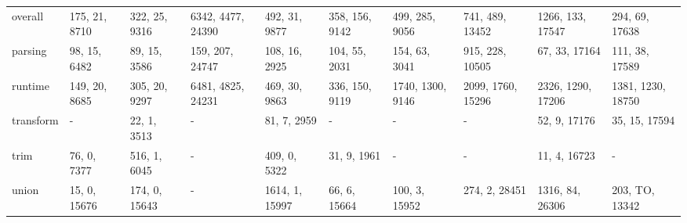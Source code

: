 \begin{tabular}{llllllllll}
 overall             & 175, 21, 8710  & 322, 25, 9316 & 6342, 4477, 24390 & 492, 31, 9877  & 358, 156, 9142 & 499, 285, 9056   & 741, 489, 13452   & 1266, 133, 17547  & 294, 69, 17638    \\
 parsing             & 98, 15, 6482   & 89, 15, 3586  & 159, 207, 24747   & 108, 16, 2925  & 104, 55, 2031  & 154, 63, 3041    & 915, 228, 10505   & 67, 33, 17164     & 111, 38, 17589    \\
 runtime             & 149, 20, 8685  & 305, 20, 9297 & 6481, 4825, 24231 & 469, 30, 9863  & 336, 150, 9119 & 1740, 1300, 9146 & 2099, 1760, 15296 & 2326, 1290, 17206 & 1381, 1230, 18750 \\
 transform           & -              & 22, 1, 3513   & -                 & 81, 7, 2959    & -              & -                & -                 & 52, 9, 17176      & 35, 15, 17594     \\
 trim                & 76, 0, 7377    & 516, 1, 6045  & -                 & 409, 0, 5322   & 31, 9, 1961    & -                & -                 & 11, 4, 16723      & -                 \\
 union               & 15, 0, 15676   & 174, 0, 15643 & -                 & 1614, 1, 15997 & 66, 6, 15664   & 100, 3, 15952    & 274, 2, 28451     & 1316, 84, 26306   & 203, TO, 13342    \\
\hline
\end{tabular}